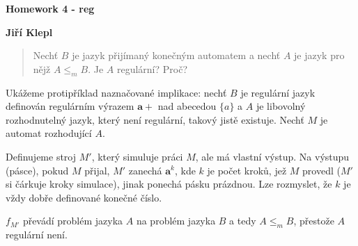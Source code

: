 \documentclass[a4paper,12pt]{article} %
\begin{document}
\thispagestyle{empty} %

\begin{center}
    {\Large \bf Homework 4 - reg}
    \vspace{2mm}

    {\bf Jiří Klepl}

\end{center}

\vspace{0.4cm}


\begin{quote}
    Nechť $B$ je jazyk přijímaný konečným automatem a nechť $A$ je jazyk pro nějž $A \leq_m B$. Je $A$ regulární? Proč?
\end{quote}

Ukážeme protipříklad naznačované implikace: nechť $B$ je regulární jazyk definován regulárním výrazem $\mathbf{a}+$ nad abecedou $\{a\}$ a $A$ je libovolný rozhodnutelný jazyk, který není regulární, takový jistě existuje. Nechť $M$ je automat rozhodující $A$.

Definujeme stroj $M'$, který simuluje práci $M$, ale má vlastní výstup. Na výstupu (pásce), pokud $M$ přijal, $M'$ zanechá $\mathbf{a}^k$, kde $k$ je počet kroků, jež $M$ provedl ($M'$ si čárkuje kroky simulace), jinak ponechá pásku prázdnou. Lze rozmyslet, že $k$ je vždy dobře definované konečné číslo.

$f_{M'}$ převádí problém jazyka $A$ na problém jazyka $B$ a tedy $A \leq_m B$, přestože $A$ regulární není.
\end{document}
